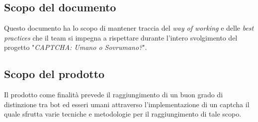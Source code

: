\subsection{Scopo del documento}
Questo documento ha lo scopo di mantener traccia del \textit{way of working} e delle \textit{best practices} che il team si impegna a rispettare durante l'intero svolgimento del progetto "\textit{CAPTCHA: Umano o Sovrumano?}".

\subsection{Scopo del prodotto}
Il prodotto come finalità prevede il raggiungimento di un buon grado di distinzione tra bot ed esseri umani attraverso l'implementazione di un captcha il quale sfrutta varie tecniche e metodologie per il raggiungimento di tale scopo.
